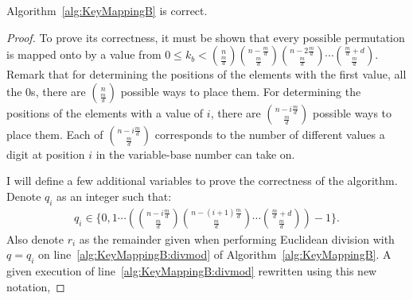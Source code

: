 \begin{theorem}
Algorithm~\ref{alg:KeyMappingB} is correct.
\end{theorem}
\begin{proof}
To prove its correctness, it must be shown that every possible permutation is mapped onto by a value from $0 \leq k_b < {n \choose \frac{m}{d}}{n - \frac{m}{d} \choose \frac{m}{d}}{n - 2\frac{m}{d} \choose \frac{m}{d}}\cdots{\frac{m}{d} + d \choose \frac{m}{d}}$. Remark that for determining the positions of the elements with the first value, all the $0$s, there are ${n \choose \frac{m}{d}}$ possible ways to place them. For determining the positions of the elements with a value of $i$, there are ${n - i\frac{m}{d} \choose \frac{m}{d}}$ possible ways to place them. Each of ${n - i\frac{m}{d} \choose \frac{m}{d}}$ corresponds to the number of different values a digit at position $i$ in the variable-base number can take on.

I will define a few additional variables to prove the correctness of the algorithm. Denote $q_i$ as an integer such that:
\begin{align}
q_i \in \{0, 1 \cdots \left({n - i\frac{m}{d} \choose \frac{m}{d}}{n - (i+1)\frac{m}{d} \choose \frac{m}{d}}\cdots{\frac{m}{d} + d \choose \frac{m}{d}}\right) - 1 \}.
\end{align}
Also denote $r_i$ as the remainder given when performing Euclidean division with $q = q_i$ on line~\ref{alg:KeyMappingB:divmod} of Algorithm~\ref{alg:KeyMappingB}. A given execution of line~\ref{alg:KeyMappingB:divmod} rewritten using this new notation,


\end{proof}
